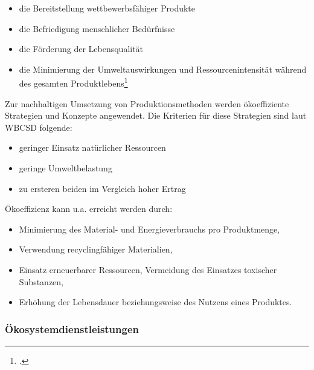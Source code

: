 \documentclass{scrartcl}
\begin{document}
 \begin{itemize}
 \item die Bereitstellung wettbewerbsfähiger Produkte
 \item die Befriedigung menschlicher Bedürfnisse 
 \item die Förderung der Lebensqualität
 \item die Minimierung der Umweltauswirkungen und Ressourcenintensität während des gesamten Produktlebens\footcite{OkoeffizienzBrockhaus.de}
 \end{itemize}

Zur nachhaltigen Umsetzung von Produktionsmethoden werden ökoeffiziente Strategien und Konzepte angewendet. Die Kriterien für diese Strategien sind laut WBCSD folgende:
\begin{itemize}
\item geringer Einsatz natürlicher Ressourcen
\item geringe Umweltbelastung
\item zu ersteren beiden im Vergleich hoher Ertrag
\end{itemize}


Ökoeffizienz kann u.a. erreicht werden durch:
\begin{itemize}
\item Minimierung des Material- und Energieverbrauchs pro Produktmenge,
\item Verwendung recyclingfähiger Materialien,
\item Einsatz erneuerbarer Ressourcen, Vermeidung des Einsatzes toxischer Substanzen,
\item Erhöhung der Lebensdauer beziehungsweise des Nutzens eines Produktes.
\end{itemize}





\subsubsection{Ökosystemdienstleistungen}
\end{document}
